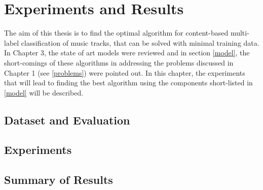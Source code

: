 \chapter{Experiments and Results} %

\label{Chapter4} %

The aim of this thesis is to find the optimal algorithm for content-based multi-label classification of music tracks, that can be solved with minimal training data. In Chapter 3, the state of art models were reviewed and in section \ref{model}, the short-comings of these algorithms in addressing the problems discussed in Chapter 1 (see \ref{problems}) were pointed out. In this chapter, the experiments that will lead to finding the best algorithm using the components short-listed in \ref{model} will be described.

\section{Dataset and Evaluation}
\label{dataset}

\section{Experiments}
\label{experiments}

\section{Summary of Results}
\label{results}